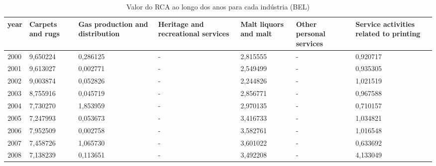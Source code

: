\begin{table}
\centering
\caption{Valor do RCA ao longo dos anos para cada indústria (BEL)}
\begin{tabular}{p{1cm}p{2cm}p{2cm}p{2cm}p{2cm}p{2cm}p{2cm}}
\toprule
 year &  Carpets and rugs &  Gas production and distribution &  Heritage and recreational services &  Malt liquors and malt &  Other personal services &  Service activities related to printing \\
\midrule
 2000 &          9,650224 &                         0,286125 &                                   - &               2,815555 &                        - &                                0,920717 \\
 2001 &          9,613027 &                         0,002771 &                                   - &               2,549499 &                        - &                                0,935305 \\
 2002 &          9,003874 &                         0,052826 &                                   - &               2,244826 &                        - &                                1,021519 \\
 2003 &          8,755916 &                         0,045719 &                                   - &               2,856771 &                        - &                                0,967588 \\
 2004 &          7,730270 &                         1,853959 &                                   - &               2,970135 &                        - &                                0,710157 \\
 2005 &          7,247993 &                         0,053673 &                                   - &               3,416733 &                        - &                                1,034821 \\
 2006 &          7,952509 &                         0,002758 &                                   - &               3,582761 &                        - &                                1,016548 \\
 2007 &          7,458726 &                         1,065730 &                                   - &               3,601022 &                        - &                                0,633692 \\
 2008 &          7,138239 &                         0,113651 &                                   - &               3,492208 &                        - &                                4,133049 \\

\end{tabular}
\end{table}
